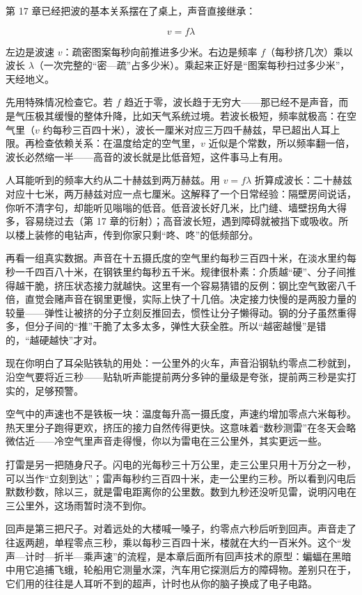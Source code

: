 \begin{mainline}
第 17 章已经把波的基本关系摆在了桌上，声音直接继承：

\[
  v = f\lambda
\]

左边是波速 \(v\)：疏密图案每秒向前推进多少米。右边是频率 \(f\)（每秒挤几次）乘以波长 \(\lambda\)（一次完整的“密—疏”占多少米）。乘起来正好是“图案每秒扫过多少米”，天经地义。

先用特殊情况检查它。若 \(f\) 趋近于零，波长趋于无穷大——那已经不是声音，而是气压极其缓慢的整体升降，比如天气系统过境。若波长极短，频率就极高：在空气里（\(v\) 约每秒三百四十米），波长一厘米对应三万四千赫兹，早已超出人耳上限。再检查依赖关系：在温度给定的空气里，\(v\) 近似是个常数，所以频率翻一倍，波长必然缩一半——高音的波长就是比低音短，这件事马上有用。

人耳能听到的频率大约从二十赫兹到两万赫兹。用 \(v=f\lambda\) 折算成波长：二十赫兹对应十七米，两万赫兹对应一点七厘米。这解释了一个日常经验：隔壁房间说话，你听不清字句，却能听见嗡嗡的低音。低音波长好几米，比门缝、墙壁拐角大得多，容易绕过去（第 17 章的衍射）；高音波长短，遇到障碍就被挡下或吸收。所以楼上装修的电钻声，传到你家只剩“咚、咚”的低频部分。

再看一组真实数据。声音在十五摄氏度的空气里约每秒三百四十米，在淡水里约每秒一千四百八十米，在钢铁里约每秒五千米。规律很朴素：介质越“硬”、分子间推得越干脆，挤压状态接力就越快。这里有一个容易猜错的反例：钢比空气致密八千倍，直觉会赌声音在钢里更慢，实际上快了十几倍。决定接力快慢的是两股力量的较量——弹性让被挤的分子立刻反推回去，惯性让分子懒得动。钢的分子虽然重得多，但分子间的“推”干脆了太多太多，弹性大获全胜。所以“越密越慢”是错的，“越硬越快”才对。

现在你明白了耳朵贴铁轨的用处：一公里外的火车，声音沿钢轨约零点二秒就到，沿空气要将近三秒——贴轨听声能提前两分多钟的量级是夸张，提前两三秒是实打实的，足够预警。

空气中的声速也不是铁板一块：温度每升高一摄氏度，声速约增加零点六米每秒。热天里分子跑得更欢，挤压的接力自然传得更快。这意味着“数秒测雷”在冬天会略微估近——冷空气里声音走得慢，你以为雷电在三公里外，其实更远一些。

打雷是另一把随身尺子。闪电的光每秒三十万公里，走三公里只用十万分之一秒，可以当作“立刻到达”；雷声每秒约三百四十米，走一公里约三秒。所以看到闪电后默数秒数，除以三，就是雷电距离你的公里数。数到九秒还没听见雷，说明闪电在三公里外，这场雨暂时浇不到你。

回声是第三把尺子。对着远处的大楼喊一嗓子，约零点六秒后听到回声。声音走了往返两趟，单程零点三秒，乘以每秒三百四十米，楼就在大约一百米外。这个“发声—计时—折半—乘声速”的流程，是本章后面所有回声技术的原型：蝙蝠在黑暗中用它追捕飞蛾，轮船用它测量水深，汽车用它探测后方的障碍物。差别只在于，它们用的往往是人耳听不到的超声，计时也从你的脑子换成了电子电路。


\end{mainline}
